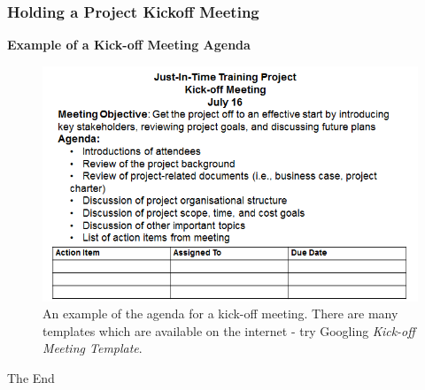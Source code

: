 \documentclass[aspectratio=169]{beamer}
\begin{document}
\begin{frame}
\frametitle{Holding a Project Kickoff Meeting}
\textbf{Example of a Kick-off Meeting Agenda}
\begin{figure}
\includegraphics[scale=0.5]{kick_off}
\caption{An example of the agenda for a kick-off meeting.  There are many templates which are available on the internet - try Googling \textit{Kick-off Meeting Template}.}
\end{figure}
\end{frame}

\begin{frame}
\begin{center}
\huge The End
\end{center}
\end{frame}
\end{document}
